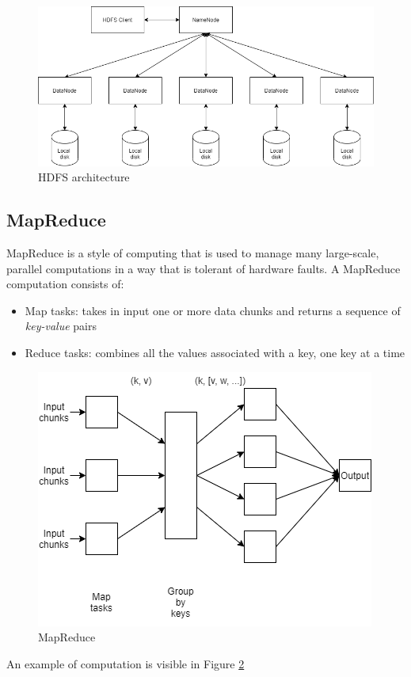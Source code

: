 \documentclass[\main/main.tex]{subfiles}
\begin{document}
\begin{figure}[H]
    \centering
    \includegraphics[scale=0.35]{images/cluster_computing/hdfs_architecture.png}
    \caption{HDFS  architecture}
    \label{fig:hdfs_architecture}
\end{figure}
\subsection{MapReduce}
MapReduce is a style of computing that is used to manage many large-scale, parallel computations in a way that is tolerant of hardware faults. A MapReduce computation consists of:
\begin{itemize}
    \item Map tasks: takes in input one or more data chunks and returns a sequence of \emph{key-value} pairs
    \item Reduce tasks: combines all the values associated with a key, one key at a time
\end{itemize}
\begin{figure}[H]
    \centering
    \includegraphics[scale=0.35]{images/cluster_computing/map_reduce_schema.png}
    \caption{MapReduce}
    \label{fig:map_reduce}
\end{figure}
An example of computation is visible in Figure \ref{fig:map_reduce}
\end{document}
